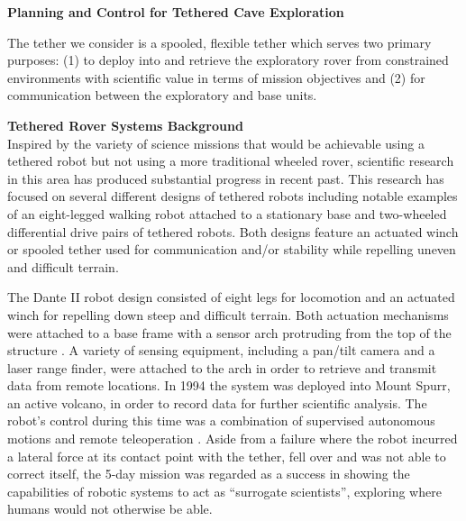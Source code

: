 \documentclass[12pt]{article}
\begin{document}
\newpage

\begin{center}
{\bf Planning and Control for Tethered Cave Exploration }

\end{center}


The tether we consider is a spooled, flexible tether which serves two primary purposes: (1) to deploy into and retrieve the exploratory rover from constrained environments with scientific value in terms of mission objectives and (2) for communication between the exploratory and base units.


{\bf Tethered Rover Systems Background \\}
Inspired by the variety of science missions that would be achievable
using a tethered robot but not using a more traditional wheeled rover, 
scientific research in this area has produced substantial progress in 
recent past. This research has focused on several different designs of
tethered robots including notable examples of an eight-legged walking robot attached to a 
stationary base and two-wheeled differential drive pairs of tethered robots. Both designs
feature an actuated winch or spooled tether used for communication and/or 
stability while repelling uneven and difficult terrain.

The Dante II robot design consisted of eight legs for locomotion and an 
actuated winch for repelling down steep and difficult terrain. Both actuation 
mechanisms were attached to 
a base frame with a sensor arch protruding from the top of the structure \cite{dante_design}. A variety of
sensing equipment, including a pan/tilt camera and a laser range finder,
 were attached to the arch in order to retrieve and transmit data from remote
 locations. In 1994 the system was deployed into Mount Spurr, an active volcano, 
 in order to record data for further scientific analysis. The robot's control 
 during this time was a combination of supervised autonomous motions and remote
 teleoperation \cite{dante_results}. Aside from a failure where the robot incurred a lateral force at its contact
point with the tether, fell over and was not able to correct itself,
 the 5-day mission was regarded as a success in showing the capabilities of robotic
 systems to act as ``surrogate scientists'', exploring where humans would not otherwise
 be able. 
\end{document}
